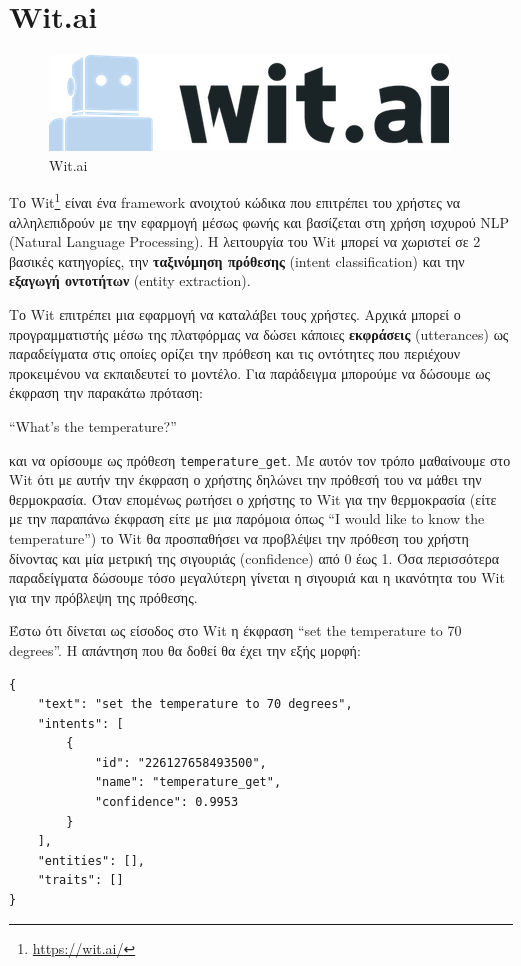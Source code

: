 \section{Wit.ai}
\label{sec:wit}

\begin{figure}[h]
    \centering
    \includegraphics[scale=0.6]{images/chapter3/wit_logo.png}
    \caption{Wit.ai}
\end{figure}
Το Wit\footnote{\href{https://wit.ai/}{https://wit.ai/}} είναι ένα framework ανοιχτού κώδικα που επιτρέπει του χρήστες να αλληλεπιδρούν με την εφαρμογή μέσως φωνής και βασίζεται στη χρήση ισχυρού NLP (Natural Language Processing). Η λειτουργία του Wit μπορεί να χωριστεί σε 2 βασικές κατηγορίες, την \textbf{ταξινόμηση πρόθεσης} (intent classification) και την \textbf{εξαγωγή οντοτήτων} (entity extraction).

Το Wit επιτρέπει μια εφαρμογή να καταλάβει τους χρήστες. Αρχικά μπορεί ο προγραμματιστής μέσω της πλατφόρμας να δώσει κάποιες \textbf{εκφράσεις} (utterances) ως παραδείγματα στις οποίες ορίζει την πρόθεση και τις οντότητες που περιέχουν προκειμένου να εκπαιδευτεί το μοντέλο. Για παράδειγμα μπορούμε να δώσουμε ως έκφραση την παρακάτω πρόταση:

\enquote{What's the temperature?}

\noindent και να ορίσουμε ως πρόθεση \texttt{temperature\_get}. Με αυτόν τον τρόπο μαθαίνουμε στο Wit ότι με αυτήν την έκφραση ο χρήστης δηλώνει την πρόθεσή του να μάθει την θερμοκρασία. Όταν επομένως ρωτήσει ο χρήστης το Wit για την θερμοκρασία (είτε με την παραπάνω έκφραση είτε με μια παρόμοια όπως \enquote{I would like to know the temperature}) το Wit θα προσπαθήσει να προβλέψει την πρόθεση του χρήστη δίνοντας και μία μετρική της σιγουριάς (confidence) από 0 έως 1. Όσα περισσότερα παραδείγματα δώσουμε τόσο μεγαλύτερη γίνεται η σιγουριά και η ικανότητα του Wit για την πρόβλεψη της πρόθεσης.

Έστω ότι δίνεται ως είσοδος στο Wit η έκφραση \enquote{set the temperature to 70 degrees}. Η απάντηση που θα δοθεί θα έχει την εξής μορφή:

\begin{lstlisting}[]
{
    "text": "set the temperature to 70 degrees",
    "intents": [
        {
            "id": "226127658493500",
            "name": "temperature_get",
            "confidence": 0.9953
        }
    ],
    "entities": [],
    "traits": []
}
\end{lstlisting}

